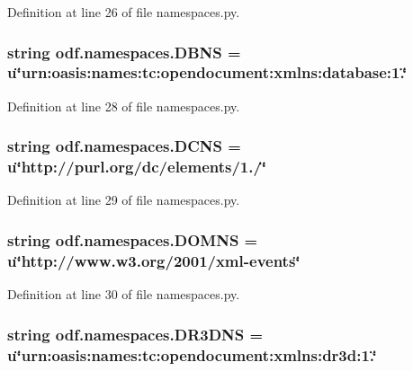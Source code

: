 Definition at line 26 of file namespaces.\+py.

\hypertarget{namespaceodf_1_1namespaces_a8af54ab4f35bb100600ecebb18bef049}{
\subsubsection[{D\+B\+N\+S}]{\setlength{\rightskip}{0pt plus 5cm}string odf.\+namespaces.\+D\+B\+N\+S = u\char`\"{}urn\+:oasis\+:names\+:tc\+:opendocument\+:xmlns\+:database\+:1.\char`\"{}}}\label{namespaceodf_1_1namespaces_a8af54ab4f35bb100600ecebb18bef049}


Definition at line 28 of file namespaces.\+py.

\hypertarget{namespaceodf_1_1namespaces_abc0ff10411221c32712c3027f62f8d21}{
\subsubsection[{D\+C\+N\+S}]{\setlength{\rightskip}{0pt plus 5cm}string odf.\+namespaces.\+D\+C\+N\+S = u\char`\"{}http\+://purl.\+org/dc/elements/1./\char`\"{}}}\label{namespaceodf_1_1namespaces_abc0ff10411221c32712c3027f62f8d21}


Definition at line 29 of file namespaces.\+py.

\hypertarget{namespaceodf_1_1namespaces_a3bcbd206bb5583e0f7f3a7a4adda46d5}{
\subsubsection[{D\+O\+M\+N\+S}]{\setlength{\rightskip}{0pt plus 5cm}string odf.\+namespaces.\+D\+O\+M\+N\+S = u\char`\"{}http\+://www.\+w3.\+org/2001/xml-\/events\char`\"{}}}\label{namespaceodf_1_1namespaces_a3bcbd206bb5583e0f7f3a7a4adda46d5}


Definition at line 30 of file namespaces.\+py.

\hypertarget{namespaceodf_1_1namespaces_a860843eba0261d640a6cb3969d284dec}{
\subsubsection[{D\+R3\+D\+N\+S}]{\setlength{\rightskip}{0pt plus 5cm}string odf.\+namespaces.\+D\+R3\+D\+N\+S = u\char`\"{}urn\+:oasis\+:names\+:tc\+:opendocument\+:xmlns\+:dr3d\+:1.\char`\"{}}}\label{namespaceodf_1_1namespaces_a860843eba0261d640a6cb3969d284dec}


